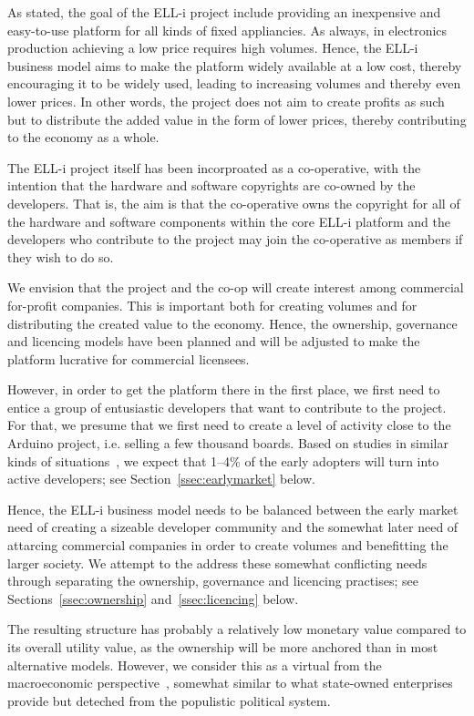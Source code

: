 \documentclass[draft,a4paper]{siamltex}
\begin{document}
As stated, the goal of the ELL-i project include providing an
inexpensive and easy-to-use platform for all kinds of fixed
appliancies.  As always, in electronics production achieving a low
price requires high volumes.  Hence, the ELL-i business model aims to
make the platform widely available at a low cost, thereby encouraging
it to be widely used, leading to increasing volumes and thereby even
lower prices.  In other words, the project does not aim to
create profits as such but to distribute the added value in the form
of lower prices, thereby contributing to the economy as a whole.

The ELL-i project itself has been incorproated as a co-operative, with
the intention that the hardware and software copyrights are co-owned
by the developers.  That is, the aim is that the co-operative owns the
copyright for all of the hardware and software components within the
core ELL-i platform and the developers who contribute to the project
may join the co-operative as members if they wish to do so.

We envision that the project and the co-op will create interest among
commercial for-profit companies.  This is important both for creating
volumes and for distributing the created value to the economy.
Hence, the ownership, governance and licencing models have been
planned and will be adjusted to make the platform lucrative for
commercial licensees.

However, in order to get the platform there in the first place, we
first need to entice a group of entusiastic developers that want to
contribute to the project.  For that, we presume that we first need to
create a level of activity close to the Arduino project, i.e. selling
a few thousand boards.  Based on studies in similar kinds of
situations~\cite{need-reference}, we expect that 1--4\% of the early
adopters will turn into active developers; see
Section~\ref{ssec:earlymarket} below.

Hence, the ELL-i business model needs to be balanced between the early
market need of creating a sizeable developer community and the
somewhat later need of attarcing commercial companies in order to
create volumes and benefitting the larger society.  We attempt to the
address these somewhat conflicting needs through separating the
ownership, governance and licencing practises; see
Sections~\ref{ssec:ownership} and~\ref{ssec:licencing} below.

The resulting structure has probably a relatively low monetary value
compared to its overall utility value, as the ownership will be more
anchored than in most alternative models.  However, we consider this
as a virtual from the macroeconomic
perspective~\cite{Olson2002}, somewhat similar to what
state-owned enterprises provide but deteched from the populistic
political system.
\end{document}

